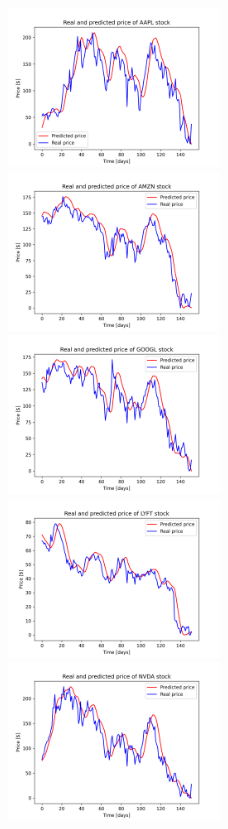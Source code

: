 \begin{figure}
\includegraphics[width=0.5\textwidth]{./graf/model7/AAPL.png}
\includegraphics[width=0.5\textwidth]{./graf/model7/AMZN.png}
\includegraphics[width=0.5\textwidth]{./graf/model7/GOOGL.png}
\includegraphics[width=0.5\textwidth]{./graf/model7/LYFT.png}
\includegraphics[width=0.5\textwidth]{./graf/model7/NVDA.png}

\end{figure}
